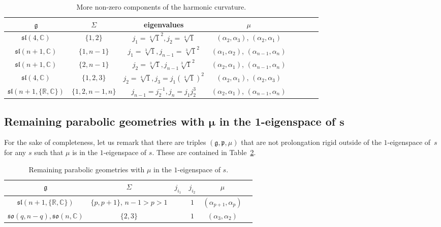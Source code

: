 \documentclass[pdftex]{sigma}
\newcommand{\fg}{\mathfrak g}
\newcommand{\fp}{\mathfrak p}
\newcommand{\C}{\mathbb{C}}
\numberwithin{equation}{section}
\begin{document}
\begin{table}[th!]\centering \caption{More non-zero components of the harmonic curvature.}\label{ahs14}\vspace{1mm}

\begin{tabular}{|c|c|c|c|c|c|c|c|}
\hline
$\fg$ & $\Sigma$ & eigenvalues & $\mu$ \\
\hline
\hline
$\mathfrak{sl}(4,\C)$ & $\{1,2\}$ & $j_1=\sqrt[4]{1}^{2}, j_2=\sqrt[4]{1}$ &$(\alpha_2,\alpha_3)$, $(\alpha_2,\alpha_1)$ \\
\hline
$\mathfrak{sl}(n+1,\mathbb{C})$ &$\{1,n-1\}$&$j_1=\sqrt[3]{1},j_{n-1}=\sqrt[3]{1}^2$& $(\alpha_1,\alpha_2)$, $(\alpha_{n-1},\alpha_n)$ \\
\hline
$\mathfrak{sl}(n+1,\mathbb{C})$ &$\{2,n-1\}$&$j_2=\sqrt[3]{1},j_{n-1}\sqrt[3]{1}^2$& $(\alpha_2,\alpha_1)$, $(\alpha_{n-1},\alpha_n)$ \\
\hline
$\mathfrak{sl}(4,\mathbb{C})$&$\{1,2,3\}$ & $j_2=\sqrt[4]{1},j_3=j_1(\sqrt[4]{1})^2$ &$(\alpha_2,\alpha_1)$, $(\alpha_2,\alpha_3)$ \\
\hline
$\mathfrak{sl}(n+1,\{\mathbb{R, C}\})$ & $\{1,2,n-1,n\}$&$j_{n-1}=j_2^{-1}, j_n=j_1j_2^3$&$(\alpha_2,\alpha_1)$, $(\alpha_{n-1},\alpha_n)$\\
\hline
\end{tabular}
\end{table}

\subsection[Remaining parabolic geometries with $\mu$ in the 1-eigenspace of $s$]{Remaining parabolic geometries with $\boldsymbol{\mu}$ in the 1-eigenspace of $\boldsymbol{s}$}

For the sake of completeness, let us remark that there are triples $(\fg,\fp,\mu)$ that are not prolongation rigid outside of the $1$-eigenspace of~$s$ for any $s$ such that $\mu$ is in the $1$-eigenspace of $s$. These are contained in Table~\ref{nhs}.

\begin{table}[th!]\centering \caption{Remaining parabolic geometries with $\mu$ in the $1$-eigenspace of $s$.}\label{nhs}\vspace{1mm}

\begin{tabular}{|c|c|c|c|c|c|}
\hline
$\fg$ & $\Sigma$ & $j_{i_1}$& $j_{i_2}$& $\mu$ \\
\hline
\hline
$\mathfrak{sl}(n+1,\{\mathbb{R, C}\})$ & $\{p,p+1\}$, $n-1>p>1$&&$1$&$(\alpha_{p+1},\alpha_p)$\\
\hline
$\mathfrak{so}(q,n-q), \mathfrak{so}(n,\mathbb{C})$ & $\{2,3\}$&&$1$&$(\alpha_{3},\alpha_2)$\\
\hline
\end{tabular}
\end{table}
\end{document}
